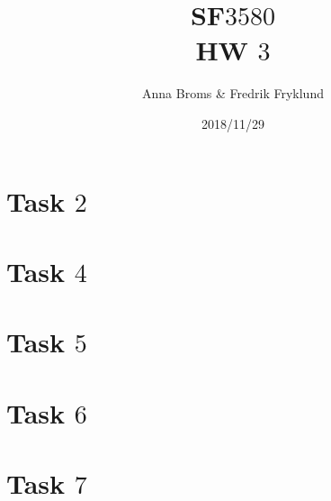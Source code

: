 \documentclass[a4paper]{article}
\title{SF$3580$\\HW $3$}
\author{Anna Broms \& Fredrik Fryklund}
\date{2018/11/29}
\begin{document}
\maketitle

 \section*{Task $2$}
 \section*{Task $4$}
 \section*{Task $5$}
 
 \section*{Task $6$}
\section*{Task $7$}
% 
\end{document}
